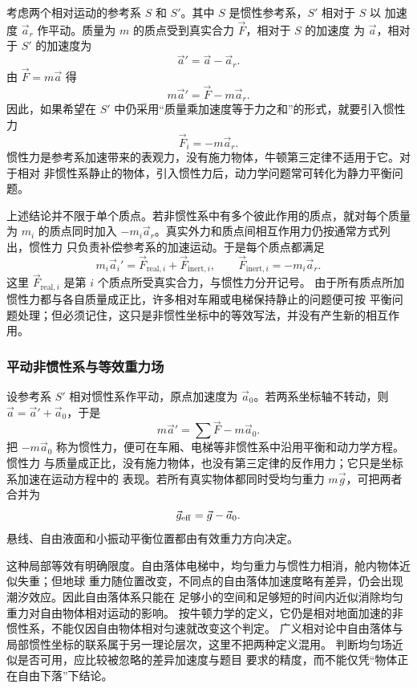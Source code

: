 {考虑两个相对运动的参考系 $S$ 和 $S'$。其中 $S$ 是惯性参考系，$S'$ 相对于 $S$ 以
加速度 $\vec a_r$ 作平动。质量为 $m$ 的质点受到真实合力 $\vec F$，相对于 $S$ 的加速度
为 $\vec a$，相对于 $S'$ 的加速度为
\[
 \vec a'=\vec a-\vec a_r.
\]
由 $\vec F=m\vec a$ 得
\[
 m\vec a'=\vec F-m\vec a_r.
\]
因此，如果希望在 $S'$ 中仍采用“质量乘加速度等于力之和”的形式，就要引入惯性力
\begin{equation}
 \boxed{\vec F_i=-m\vec a_r}. \label{ch06:eq:s06-2-12}
\end{equation}
惯性力是参考系加速带来的表观力，没有施力物体，牛顿第三定律不适用于它。对于相对
非惯性系静止的物体，引入惯性力后，动力学问题常可转化为静力平衡问题。

上述结论并不限于单个质点。若非惯性系中有多个彼此作用的质点，就对每个质量为 $m_i$
的质点同时加入 $-m_i\vec a_r$。真实外力和质点间相互作用力仍按通常方式列出，惯性力
只负责补偿参考系的加速运动。于是每个质点都满足
\[
 m_i\vec a_i'=\vec F_{\mathrm{real},i}+\vec F_{\mathrm{inert},i},
 \qquad \vec F_{\mathrm{inert},i}=-m_i\vec a_r.
\]
这里 $\vec F_{\mathrm{real},i}$ 是第 $i$ 个质点所受真实合力，与惯性力分开记号。
由于所有质点所加惯性力都与各自质量成正比，许多相对车厢或电梯保持静止的问题便可按
平衡问题处理；但必须记住，这只是非惯性坐标中的等效写法，并没有产生新的相互作用。

\subsubsection*{平动非惯性系与等效重力场}

设参考系 $S'$ 相对惯性系作平动，原点加速度为 $\vec a_0$。若两系坐标轴不转动，则
$\vec a=\vec a'+\vec a_0$，于是
\begin{equation}
 m\vec a'=\sum\vec F-m\vec a_0.
\end{equation}
把 $-m\vec a_0$ 称为惯性力，便可在车厢、电梯等非惯性系中沿用平衡和动力学方程。惯性力
与质量成正比，没有施力物体，也没有第三定律的反作用力；它只是坐标系加速在运动方程中的
表现。若所有真实物体都同时受均匀重力 $m\vec g$，可把两者合并为
\begin{equation}
 \vec g_{\rm eff}=\vec g-\vec a_0.
\end{equation}
悬线、自由液面和小振动平衡位置都由有效重力方向决定。

这种局部等效有明确限度。自由落体电梯中，均匀重力与惯性力相消，舱内物体近似失重；但地球
重力随位置改变，不同点的自由落体加速度略有差异，仍会出现潮汐效应。因此自由落体系只能在
足够小的空间和足够短的时间内近似消除均匀重力对自由物体相对运动的影响。
按牛顿力学的定义，它仍是相对地面加速的非惯性系，不能仅因自由物体相对匀速就改变这个判定。
广义相对论中自由落体与局部惯性坐标的联系属于另一理论层次，这里不把两种定义混用。
判断均匀场近似是否可用，应比较被忽略的差异加速度与题目
要求的精度，而不能仅凭“物体正在自由下落”下结论。

}

